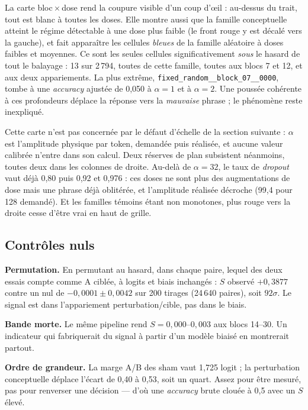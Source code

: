 \documentclass[a4paper,10pt]{article}
\begin{document}
La carte bloc\,$\times$\,dose rend la coupure visible d'un coup d'{\oe}il : au-dessus du trait,
tout est blanc à toutes les doses. Elle montre aussi que la famille conceptuelle atteint le régime
détectable à une dose plus faible (le front rouge y est décalé vers la gauche), et fait apparaître
les cellules \emph{bleues} de la famille aléatoire à doses faibles et moyennes. Ce sont les seules
cellules significativement \emph{sous} le hasard de tout le balayage : 13 sur 2\,794, toutes de
cette famille, toutes aux blocs 7 et 12, et aux deux appariements. La plus extrême,
\texttt{fixed\_random\_\_block\_07\_\_0000}, tombe à une \emph{accuracy} ajustée de 0,050 à
$\alpha = 1$ et à $\alpha = 2$. Une poussée cohérente à ces profondeurs déplace la réponse
vers la \emph{mauvaise} phrase ; le phénomène reste inexpliqué.

Cette carte n'est pas concernée par le défaut d'échelle de la section suivante : $\alpha$ est
l'amplitude physique par token, demandée puis réalisée, et aucune valeur calibrée n'entre dans son
calcul. Deux réserves de plan subsistent néanmoins, toutes deux dans les colonnes de droite.
Au-delà de $\alpha = 32$, le taux de \emph{dropout} vaut déjà 0,80 puis 0,92 et 0,976 : ces doses
ne sont plus des augmentations de dose mais une phrase déjà oblitérée, et l'amplitude réalisée
décroche (99,4 pour 128 demandé). Et les familles témoins étant non monotones, \og plus rouge vers
la droite\fg{} cesse d'être vrai en haut de grille.

\subsection{Contrôles nuls}

\textbf{Permutation.} En permutant au hasard, dans chaque paire, lequel des deux essais compte comme
\og A ciblée\fg{}, à logits et biais inchangés : $S$ observé $+0{,}3877$ contre un nul de
$-0{,}0001 \pm 0{,}0042$ sur 200 tirages (24\,640 paires), soit $92\sigma$. Le signal est
dans l'appariement perturbation/cible, pas dans le biais.

\textbf{Bande morte.} Le même pipeline rend $S = 0{,}000$--$0{,}003$ aux blocs 14--30. Un indicateur
qui fabriquerait du signal à partir d'un modèle biaisé en montrerait partout.

\textbf{Ordre de grandeur.} La marge A/B des sham vaut 1,725 logit ; la perturbation conceptuelle
déplace l'écart de 0,40 à 0,53, soit un quart. Assez pour être mesuré, pas pour renverser une
décision --- d'où une \emph{accuracy} brute clouée à 0,5 avec un $S$ élevé.
\end{document}
